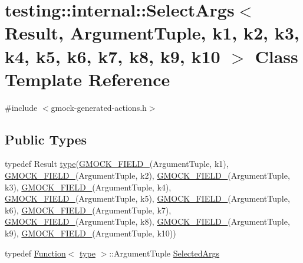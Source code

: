 \hypertarget{classtesting_1_1internal_1_1SelectArgs}{}\section{testing\+:\+:internal\+:\+:Select\+Args$<$ Result, Argument\+Tuple, k1, k2, k3, k4, k5, k6, k7, k8, k9, k10 $>$ Class Template Reference}
\label{classtesting_1_1internal_1_1SelectArgs}


{\ttfamily \#include $<$gmock-\/generated-\/actions.\+h$>$}

\subsection*{Public Types}
\begin{DoxyCompactItemize}
\item 
typedef Result \hyperlink{classtesting_1_1internal_1_1SelectArgs_a9e8d3a748637b91376acab2330d87749}{type}(\hyperlink{gmock-generated-actions_8h_a6eb3ce92b0613603057a20ec9e593317}{G\+M\+O\+C\+K\+\_\+\+F\+I\+E\+L\+D\+\_\+}(Argument\+Tuple, k1), \hyperlink{gmock-generated-actions_8h_a6eb3ce92b0613603057a20ec9e593317}{G\+M\+O\+C\+K\+\_\+\+F\+I\+E\+L\+D\+\_\+}(Argument\+Tuple, k2), \hyperlink{gmock-generated-actions_8h_a6eb3ce92b0613603057a20ec9e593317}{G\+M\+O\+C\+K\+\_\+\+F\+I\+E\+L\+D\+\_\+}(Argument\+Tuple, k3), \hyperlink{gmock-generated-actions_8h_a6eb3ce92b0613603057a20ec9e593317}{G\+M\+O\+C\+K\+\_\+\+F\+I\+E\+L\+D\+\_\+}(Argument\+Tuple, k4), \hyperlink{gmock-generated-actions_8h_a6eb3ce92b0613603057a20ec9e593317}{G\+M\+O\+C\+K\+\_\+\+F\+I\+E\+L\+D\+\_\+}(Argument\+Tuple, k5), \hyperlink{gmock-generated-actions_8h_a6eb3ce92b0613603057a20ec9e593317}{G\+M\+O\+C\+K\+\_\+\+F\+I\+E\+L\+D\+\_\+}(Argument\+Tuple, k6), \hyperlink{gmock-generated-actions_8h_a6eb3ce92b0613603057a20ec9e593317}{G\+M\+O\+C\+K\+\_\+\+F\+I\+E\+L\+D\+\_\+}(Argument\+Tuple, k7), \hyperlink{gmock-generated-actions_8h_a6eb3ce92b0613603057a20ec9e593317}{G\+M\+O\+C\+K\+\_\+\+F\+I\+E\+L\+D\+\_\+}(Argument\+Tuple, k8), \hyperlink{gmock-generated-actions_8h_a6eb3ce92b0613603057a20ec9e593317}{G\+M\+O\+C\+K\+\_\+\+F\+I\+E\+L\+D\+\_\+}(Argument\+Tuple, k9), \hyperlink{gmock-generated-actions_8h_a6eb3ce92b0613603057a20ec9e593317}{G\+M\+O\+C\+K\+\_\+\+F\+I\+E\+L\+D\+\_\+}(Argument\+Tuple, k10))
\item 
typedef \hyperlink{structtesting_1_1internal_1_1Function}{Function}$<$ \hyperlink{classtesting_1_1internal_1_1SelectArgs_a9e8d3a748637b91376acab2330d87749}{type} $>$\+::Argument\+Tuple \hyperlink{classtesting_1_1internal_1_1SelectArgs_ad1eaa794653b3f4cefdb5c2285b418a7}{Selected\+Args}
\end{DoxyCompactItemize}
